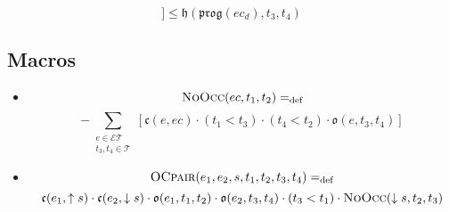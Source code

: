 \begin{itemize}
\begin{itemize}
\[				            ] \leq  \mathfrak{h}(\mathfrak{prog}(ec_d), t_3, t_4)\]
	      \end{itemize}
\end{itemize}

\subsection{Macros}
\begin{itemize}
	\item \[\textsc{NoOcc}(ec, t_1, t_2) =_{\text{def}}\]
	      \[ -\sum_{\substack{{e \in \mathcal{ET}} \\ t_3, t_4 \in \mathcal{T}}}
		      [\mathfrak{c}(e, ec) \cdot (t_1 < t_3) \cdot (t_4 < t_2) \cdot \mathfrak{o}(e, t_3, t_4)]\]
	\item \[
		      \textsc{OCpair}(e_1, e_2, s, t_1, t_2, t_3, t_4) =_{\text{def}}
	      \]
	      \[
		      \mathfrak{c}(e_1, \uparrow s) \cdot \mathfrak{c}(e_2, \downarrow s) \cdot \mathfrak{o}(e_1, t_1, t_2) \cdot \mathfrak{o}(e_2, t_3, t_4) \cdot (t_3 < t_1) \cdot \textsc{NoOcc}(\downarrow s, t_2, t_3)
	      \]
\end{itemize}

